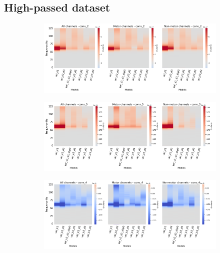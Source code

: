 \subsection*{High-passed dataset}\label{subsec:vel-high-passed-dataset-appendixA}
\begin{figure}[!htpb]
\centering
\begin{subfigure}[a]{\textwidth}
   \includegraphics[width=1\linewidth]{img/appendix/A/conv-2/hp-m/vel-model-gradients_all_kinds}
   \caption{}
   \label{fig:vel-hp-grads-conv-2}
\end{subfigure}

\begin{subfigure}[b]{\textwidth}
   \includegraphics[width=1\linewidth]{img/appendix/A/conv-3/hp-m/vel-model-gradients_all_kinds}
   \caption{}
   \label{fig:vel-hp-grads-conv-3}
\end{subfigure}

\begin{subfigure}[c]{\textwidth}
   \includegraphics[width=1\linewidth]{img/appendix/A/conv-4/hp-m/vel-model_gradients_all_kinds}
   \caption{}
   \label{fig:vel-hp-grads-conv-4}
\end{subfigure}


\end{figure}

